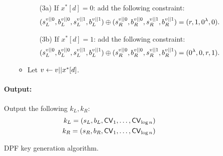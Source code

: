 \begin{figure}[p]
\begin{minipage}{\textwidth}
\begin{mdframed}
\begin{itemize}[label={},leftmargin=*]
\begin{itemize}
\begin{enumerate}
\vspace{2pt}
                        \item[(3a)] If $x^*[d]=0$: add the following constraint: 
                        \begin{align*}
                            (s^{v||0}_L, b^{v||0}_L, s^{v||1}_L, b^{v||1}_L) \oplus (s^{v||0}_R, b^{v||0}_R, s^{v||1}_R, b^{v||1}_R) = (r, 1, 0^{\lambda}, 0).
                        \end{align*}
                        \item[(3b)] If $x^*[d]=1$: add the following constraint: 
                        \begin{align*}
                            (s^{v||0}_L, b^{v||0}_L, s^{v||1}_L, b^{v||1}_L) \oplus (s^{v||0}_R, b^{v||0}_R, s^{v||1}_R, b^{v||1}_R) = (0^{\lambda}, 0, r, 1).
                        \end{align*}
                    \end{enumerate}
                    \item Let $v\leftarrow v||x^*[d]$.
                \end{itemize}  
            \end{itemize}
            \paragraph{Output:} Output the following $k_L, k_R$:
            \begin{align*}
                k_L=(s_L, b_L, {\sf CV}_1,\dots,{\sf CV}_{\log n}) \\
                k_R=(s_R, b_R, {\sf CV}_1,\dots,{\sf CV}_{\log n})
            \end{align*}
            
        \end{mdframed}
    \end{minipage}
    \caption{DPF key generation algorithm.\label{fig:DPF}}
\label{fig:gen}
\end{figure}




